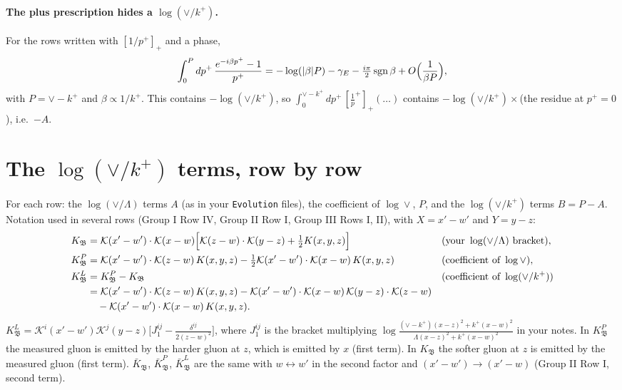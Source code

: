 \documentclass[10pt]{article}
\numberwithin{equation}{section}
\newcommand{\KK}{\mathcal K}
\newcommand{\kp}{k^+}
\newcommand{\pp}{p^+}
\begin{document}
\paragraph{The plus prescription hides a $\log(\vee/k^+)$.} For the rows written with $[1/\pp]_+$ and a phase,
\begin{equation}
\int_0^{P}d\pp\,\frac{e^{-i\beta\pp}-1}{\pp}=-\log(|\beta|P)-\gamma_E-\tfrac{i\pi}{2}\,{\rm sgn}\,\beta+O\Big(\frac{1}{\beta P}\Big),
\label{eq:phase}
\end{equation}
with $P=\vee-\kp$ and $\beta\propto 1/\kp$. This contains $-\log(\vee/k^+)$, so $\int_0^{\vee-\kp}d\pp\,[\frac1\pp]_+(\dots)$ contains $-\log(\vee/k^+)\times$(the residue at $\pp=0$), i.e.\ $-A$.

\section{The \texorpdfstring{$\log(\vee/k^+)$}{log(vee/k+)} terms, row by row}\label{sec:rows}
For each row: the $\log(\vee/\Lambda)$ terms $A$ (as in your \texttt{Evolution} files), the coefficient of $\log\vee$, $P$, and the $\log(\vee/k^+)$ terms $B=P-A$. Notation used in several rows (Group I Row IV, Group II Row I, Group III Rows I, II), with $X=x'-w'$ and $Y=y-z$:
\begin{align}
K_{\mathfrak B}&=\KK(x'-w')\cdot\KK(x-w)\Big[\KK(z-w)\cdot\KK(y-z)+\tfrac12K(x,y,z)\Big] &&(\text{your }\log(\vee/\Lambda)\text{ bracket}),\\
K^P_{\mathfrak B}&=\KK(x'-w')\cdot\KK(z-w)\,K(x,y,z)-\tfrac12\KK(x'-w')\cdot\KK(x-w)\,K(x,y,z) &&(\text{coefficient of }\log\vee),\\
K^{L}_{\mathfrak B}&=K^P_{\mathfrak B}-K_{\mathfrak B} &&(\text{coefficient of }\log(\vee/k^+))\notag\\
&=\KK(x'-w')\cdot\KK(z-w)\,K(x,y,z)-\KK(x'-w')\cdot\KK(x-w)\,\KK(y-z)\cdot\KK(z-w)\notag\\
&\quad-\KK(x'-w')\cdot\KK(x-w)\,K(x,y,z).
\end{align}
$K^{L}_{\mathfrak B}=\KK^i(x'-w')\KK^j(y-z)\big[J_1^{ij}-\frac{\delta^{ij}}{2(z-w)^2}\big]$, where $J_1^{ij}$ is the bracket multiplying $\log\frac{(\vee-k^+)(x-z)^2+k^+(x-w)^2}{\Lambda(x-z)^2+k^+(x-w)^2}$ in your notes. In $K^P_{\mathfrak B}$ the measured gluon is emitted by the harder gluon at $z$, which is emitted by $x$ (first term). In $K_{\mathfrak B}$ the softer gluon at $z$ is emitted by the measured gluon (first term). $\bar K_{\mathfrak B}$, $\bar K^P_{\mathfrak B}$, $\bar K^L_{\mathfrak B}$ are the same with $w\leftrightarrow w'$ in the second factor and $(x'-w')\to(x'-w)$ (Group II Row I, second term).
\end{document}
